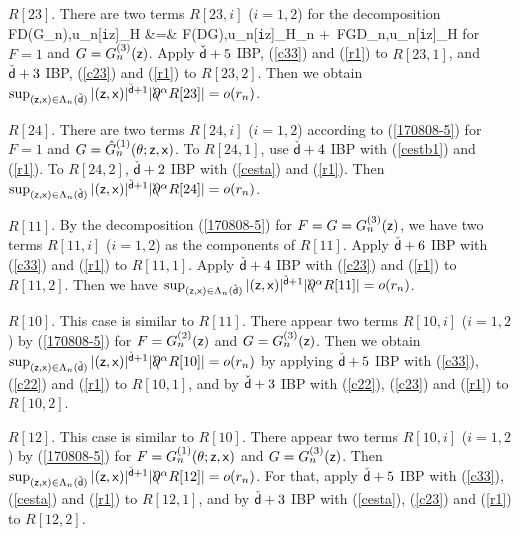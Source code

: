 \documentclass[a4paper]{article}
\numberwithin{equation}{section}
\def\csfd{{\check{\sfd}}}
\def\tti{{\tt i}}
\newcommand{\sfx}{{\sf x}}
\newcommand{\sfz}{{\sf z}}
\def\sfd{{\sf d}}
\def\partialbs{\backslash\!\!\!\partial}
\def\HH{\EuFrak H}
\begin{document}
{\im $R[23]$. 
There are two terms $R[23,i]$ ($i=1,2$) for the decomposition 
\bea\label{170808-5} 
F\big\langle D\big(G\psi_n\big),u_n[\tti\sfz]\big\rangle_\HH
&=&
F\big\langle (DG),u_n[\tti\sfz]\big\rangle_\HH\psi_n
+\ FG\big\langle D\psi_n,u_n[\tti\sfz]\big\rangle_\HH
\eea
for $F=1$ and $G=G^{(3)}_n(\sfz)$. 
Apply $\csfd+5$ IBP, (\ref{c33}) and (\ref{r1}) to $R[23,1]$, and 
$\csfd+3$ IBP, (\ref{c23}) and (\ref{r1}) to $R[23,2]$. 
Then we obtain $\sup_{(\sfz,\sfx)\in\Lambda_n(\csfd)}|(\sfz,\sfx)|^{\csfd+1}|\partialbs^\alpha R[23]|=o(r_n)$. 

\im $R[24]$. There are two terms $R[24,i]$ ($i=1,2$) 
according to (\ref{170808-5}) for $F=1$ and $G=\hat{G}^{(1)}_n(\theta;\sfz,\sfx)$. 
To $R[24,1]$, use $\csfd+4$ IBP with (\ref{cestb1}) and (\ref{r1}). 
To $R[24,2]$, $\csfd+2$ IBP with (\ref{cesta}) and (\ref{r1}). 
Then $\sup_{(\sfz,\sfx)\in\Lambda_n(\csfd)}|(\sfz,\sfx)|^{\csfd+1}|\partialbs^\alpha R[24]|=o(r_n)$. 

\im $R[11]$. By the decomposition (\ref{170808-5}) 
for $F=G=G^{(3)}_n(\sfz)$, 
we have two terms $R[11,i]$ ($i=1,2$) as the components of $R[11]$. 
Apply $\csfd+6$ IBP with (\ref{c33}) and (\ref{r1}) to $R[11,1]$. 
Apply $\csfd+4$ IBP with (\ref{c23}) and (\ref{r1}) to $R[11,2]$. 
Then we have $\sup_{(\sfz,\sfx)\in\Lambda_n(\csfd)}|(\sfz,\sfx)|^{\csfd+1}|\partialbs^\alpha R[11]|=o(r_n)$. 

\im $R[10]$. This case is similar to $R[11]$. 
There appear two terms $R[10,i]$ ($i=1,2$) by (\ref{170808-5}) 
for $F=G^{(2)}_n(\sfz)$ and $G=G^{(3)}_n(\sfz)$.  
Then we obtain 
$\sup_{(\sfz,\sfx)\in\Lambda_n(\csfd)}|(\sfz,\sfx)|^{\csfd+1}|\partialbs^\alpha R[10]|=o(r_n)$ 
by applying $\csfd+5$ IBP with (\ref{c33}), (\ref{c22}) and (\ref{r1}) to $R[10,1]$, and 
by $\csfd+3$ IBP with (\ref{c22}), (\ref{c23}) and (\ref{r1}) to $R[10,2]$. 

\im $R[12]$. This case is similar to $R[10]$. 
There appear two terms $R[10,i]$ ($i=1,2$) by (\ref{170808-5}) 
for $F=G^{(1)}_n(\theta;\sfz,\sfx)$ and $G=G^{(3)}_n(\sfz)$.  
Then 
$\sup_{(\sfz,\sfx)\in\Lambda_n(\csfd)}|(\sfz,\sfx)|^{\csfd+1}|\partialbs^\alpha R[12]|=o(r_n)$. 
For that, apply $\csfd+5$ IBP with (\ref{c33}), (\ref{cesta}) and (\ref{r1}) to $R[12,1]$, and 
by $\csfd+3$ IBP with (\ref{cesta}), (\ref{c23}) and (\ref{r1}) to $R[12,2]$. 

}
\end{document}
